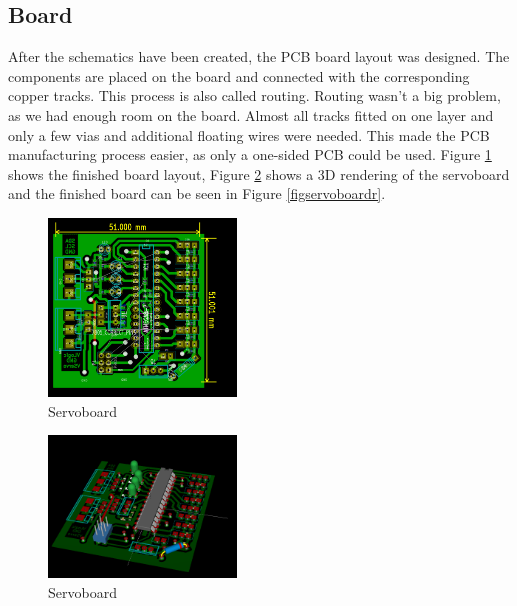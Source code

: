 \documentclass[12pt]{article}
\begin{document}
\subsection{Board}
After the schematics have been created, the PCB board layout was designed.
The components are placed on the board and connected with the corresponding copper tracks.
This process is also called routing.
Routing wasn't a big problem, as we had enough room on the board.
Almost all tracks fitted on one layer and only a few vias and additional floating wires were needed.
This made the PCB manufacturing process easier, as only a one-sided PCB could be used.
Figure \ref{figservoboardbrd} shows the finished board layout, Figure \ref{figservoboard3d} shows a 3D rendering of the servoboard and the finished board can be seen in Figure \ref{figservoboardr}.


\begin{figure}[h]
\begin{center}
\includegraphics[width=5cm]{pic/servoboardbrd.png}
\caption{Servoboard}
\end{center}
\label{figservoboardbrd}
\end{figure}

\begin{figure}[h]
\begin{center}
\includegraphics[width=5cm]{pic/servoboard3d.png}
\caption{Servoboard}
\end{center}
\label{figservoboard3d}
\end{figure}
\end{document}
